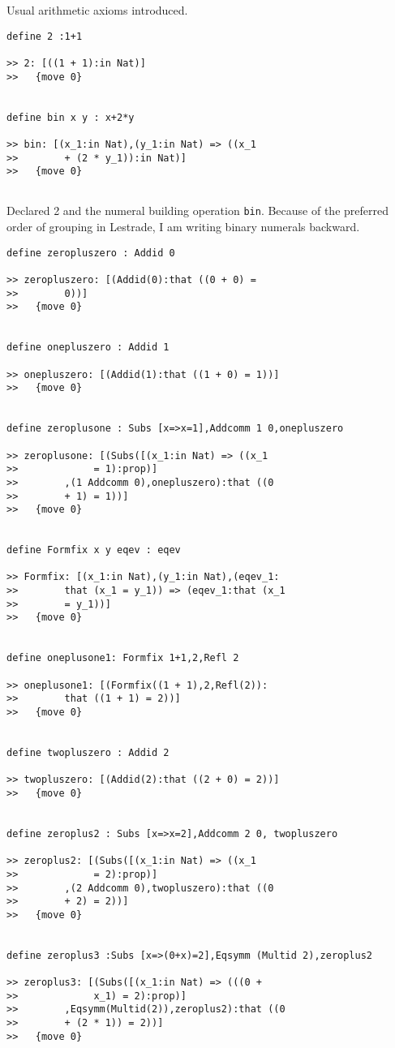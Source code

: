 \documentclass{article}
\begin{document}
Usual arithmetic axioms introduced.

\begin{verbatim}
define 2 :1+1

>> 2: [((1 + 1):in Nat)]
>>   {move 0}


define bin x y : x+2*y

>> bin: [(x_1:in Nat),(y_1:in Nat) => ((x_1 
>>        + (2 * y_1)):in Nat)]
>>   {move 0}


\end{verbatim}

Declared 2 and the numeral building operation {\tt bin}.  Because of the preferred order of grouping in Lestrade, I am writing binary numerals backward.

\begin{verbatim}
define zeropluszero : Addid 0

>> zeropluszero: [(Addid(0):that ((0 + 0) = 
>>        0))]
>>   {move 0}


define onepluszero : Addid 1

>> onepluszero: [(Addid(1):that ((1 + 0) = 1))]
>>   {move 0}


define zeroplusone : Subs [x=>x=1],Addcomm 1 0,onepluszero

>> zeroplusone: [(Subs([(x_1:in Nat) => ((x_1 
>>             = 1):prop)]
>>        ,(1 Addcomm 0),onepluszero):that ((0 
>>        + 1) = 1))]
>>   {move 0}


define Formfix x y eqev : eqev

>> Formfix: [(x_1:in Nat),(y_1:in Nat),(eqev_1:
>>        that (x_1 = y_1)) => (eqev_1:that (x_1 
>>        = y_1))]
>>   {move 0}


define oneplusone1: Formfix 1+1,2,Refl 2

>> oneplusone1: [(Formfix((1 + 1),2,Refl(2)):
>>        that ((1 + 1) = 2))]
>>   {move 0}


define twopluszero : Addid 2

>> twopluszero: [(Addid(2):that ((2 + 0) = 2))]
>>   {move 0}


define zeroplus2 : Subs [x=>x=2],Addcomm 2 0, twopluszero

>> zeroplus2: [(Subs([(x_1:in Nat) => ((x_1 
>>             = 2):prop)]
>>        ,(2 Addcomm 0),twopluszero):that ((0 
>>        + 2) = 2))]
>>   {move 0}


define zeroplus3 :Subs [x=>(0+x)=2],Eqsymm (Multid 2),zeroplus2

>> zeroplus3: [(Subs([(x_1:in Nat) => (((0 + 
>>             x_1) = 2):prop)]
>>        ,Eqsymm(Multid(2)),zeroplus2):that ((0 
>>        + (2 * 1)) = 2))]
>>   {move 0}



\end{verbatim}
\end{document}

